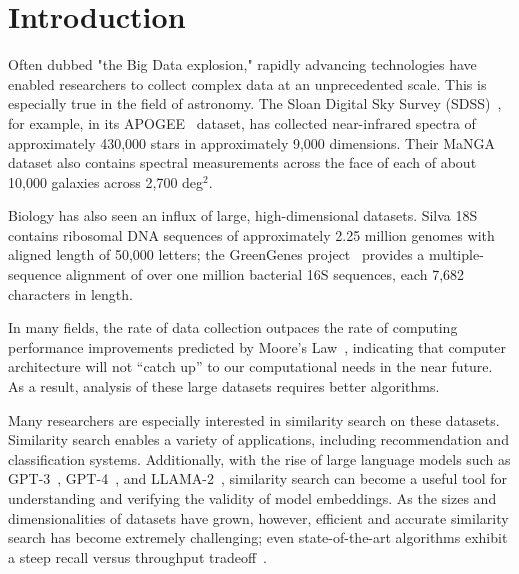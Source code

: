 \section{Introduction}
\label{sec:introduction}
Often dubbed "the Big Data explosion," rapidly advancing technologies have enabled researchers to collect complex data at an unprecedented scale. 
This is especially true in the field of astronomy. 
The Sloan Digital Sky Survey (SDSS)~\cite{blanton2017sdss}, for example, in its APOGEE~\cite{alam2015eleventh} dataset, has collected near-infrared spectra of approximately 430,000 stars in approximately 9,000 dimensions. 
Their MaNGA dataset also contains spectral measurements across the face of each of about 10,000 galaxies across 2,700 deg$^2$. 

Biology has also seen an influx of large, high-dimensional datasets. Silva 18S~\cite{10.1093/nar/gks1219} contains ribosomal DNA sequences of approximately 2.25 
million genomes with aligned length of 50,000 letters; 
the GreenGenes project~\cite{desantis2006greengenes} provides a multiple-sequence alignment of over one million bacterial 16S sequences, each 7,682 characters in length. 




In many fields, the rate of data collection outpaces the rate of computing performance improvements predicted by Moore's Law~\cite{brescia2012extracting}, indicating 
that computer architecture will not ``catch up'' to our computational needs in the near future. As a result, analysis of these large datasets 
requires better algorithms. 

Many researchers are especially interested in similarity search on these datasets. 
Similarity search enables a variety of applications, including recommendation and classification systems. 
Additionally, with the rise of large language models such as GPT-3~\cite{2020arXiv200514165B}, GPT-4~\cite{OpenAI2023GPT4TR}, and LLAMA-2~\cite{Touvron2023Llama2O}, similarity search can become a useful tool for 
understanding and verifying the validity of model embeddings. 
As the sizes and dimensionalities of datasets have grown, however, efficient and accurate similarity search has become extremely challenging; 
even state-of-the-art algorithms exhibit a steep recall versus throughput tradeoff~\cite{ishaq2019clustered}.


